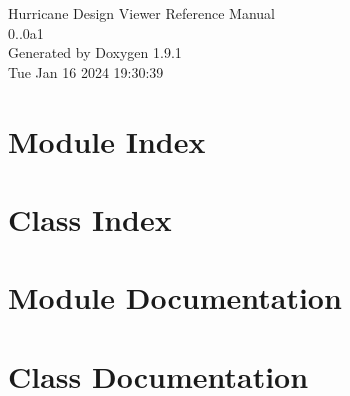 \documentclass[a4paper]{asimbook}
\begin{document}
   \begin{titlepage}
     \vspace*{7cm}
     \begin{center}
     {\Large Hurricane Design Viewer Reference Manual\\[1ex]\large 0..\+0a1 }\\
     \vspace*{1cm}
     {\large Generated by Doxygen 1.9.1}\\
     \vspace*{0.5cm}
     {\small Tue Jan 16 2024 19:30:39}\\
     \end{center}
   \end{titlepage}

   \clearemptydoublepage

   \tableofcontents
   \clearemptydoublepage

\chapter{Module Index}

\chapter{Class Index}

\chapter{Module Documentation}

\chapter{Class Documentation}








\backmatter
\newpage
{}
\clearemptydoublepage
{}
\printindex
\end{document}
